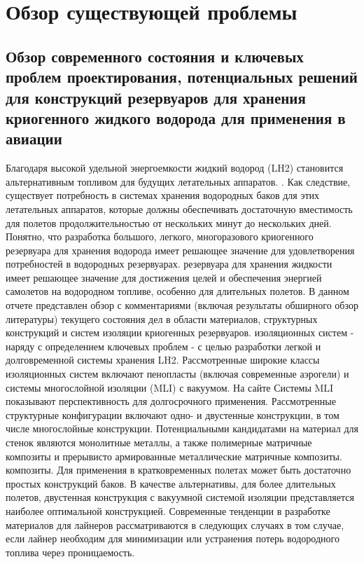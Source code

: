 \chapter{Обзор существующей проблемы}\label{ch:overview}

\section{Обзор современного состояния и ключевых проблем проектирования, потенциальных решений для конструкций резервуаров для хранения криогенного жидкого водорода для применения в авиации}\label{sec:overview/sec1}

Благодаря высокой удельной энергоемкости жидкий водород (LH2) становится альтернативным топливом для будущих летательных аппаратов. . Как следствие, существует потребность в системах хранения водородных баков для этих летательных аппаратов, которые должны обеспечивать достаточную вместимость для полетов продолжительностью от нескольких минут до нескольких дней. Понятно, что разработка большого, легкого, многоразового криогенного резервуара для хранения водорода имеет решающее значение для удовлетворения потребностей в водородных резервуарах. резервуара для хранения жидкости имеет решающее значение для достижения целей и обеспечения энергией самолетов на водородном топливе, особенно для длительных полетов. В данном отчете представлен обзор с комментариями (включая результаты обширного обзор литературы) текущего состояния дел в области материалов, структурных конструкций и систем изоляции криогенных резервуаров. изоляционных систем - наряду с определением ключевых проблем - с целью разработки легкой и долговременной системы хранения LH2. Рассмотренные широкие классы изоляционных систем включают пенопласты (включая современные аэрогели) и системы многослойной изоляции (MLI) с вакуумом. На сайте Системы MLI показывают перспективность для долгосрочного применения. Рассмотренные структурные конфигурации включают одно- и двустенные конструкции, в том числе многослойные конструкции. Потенциальными кандидатами на материал для стенок являются монолитные металлы, а также полимерные матричные композиты и прерывисто армированные металлические матричные композиты. композиты. Для применения в кратковременных полетах может быть достаточно простых конструкций баков. В качестве альтернативы, для более длительных полетов, двустенная конструкция с вакуумной системой изоляции
представляется наиболее оптимальной конструкцией. Современные тенденции в разработке материалов для лайнеров рассматриваются в следующих случаях в том случае, если лайнер необходим для минимизации или устранения потерь водородного топлива через проницаемость.

\cite{einstein}